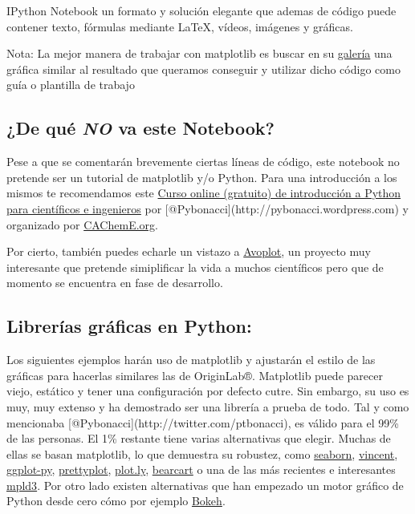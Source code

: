 \documentclass{article}
\begin{document}
IPython Notebook un formato y solución elegante que ademas de código
puede contener texto, fórmulas mediante \LaTeX, vídeos, imágenes y
gráficas.

    Nota: La mejor manera de trabajar con matplotlib es buscar en su
\href{http://matplotlib.org/gallery.html}{galería} una gráfica similar
al resultado que queramos conseguir y utilizar dicho código como guía o
plantilla de trabajo


    \subsection{¿De qué \emph{NO} va este Notebook?}


    Pese a que se comentarán brevemente ciertas líneas de código, este
notebook no pretende ser un tutorial de matplotlib y/o Python. Para una
introducción a los mismos te recomendamos este
\href{http://cacheme.org/curso-online-python-cientifico-ingenieros/}{Curso
online (gratuito) de introducción a Python para científicos e
ingenieros} por {[}@Pybonacci{]}(http://pybonacci.wordpress.com) y
organizado por \href{http://cacheme.org}{CAChemE.org}.

Por cierto, también puedes echarle un vistazo a
\href{https://www.youtube.com/watch?v=_Bm8M9IwuFk}{Avoplot}, un proyecto
muy interesante que pretende simiplificar la vida a muchos científicos
pero que de momento se encuentra en fase de desarrollo.


    \subsection{Librerías gráficas en Python:}


    Los siguientes ejemplos harán uso de matplotlib y ajustarán el estilo de
las gráficas para hacerlas similares las de OriginLab®. Matplotlib puede
parecer viejo, estático y tener una configuración por defecto cutre. Sin
embargo, su uso es muy, muy extenso y ha demostrado ser una librería a
prueba de todo. Tal y como mencionaba
{[}@Pybonacci{]}(http://twitter.com/ptbonacci), es válido para el 99\%
de las personas. El 1\% restante tiene varias alternativas que elegir.
Muchas de ellas se basan matplotlib, lo que demuestra su robustez, como
\href{http://www.stanford.edu/~mwaskom/software/seaborn/}{seaborn},
\href{http://vincent.readthedocs.org/en/latest/}{vincent},
\href{http://blog.yhathq.com/posts/ggplot-for-python.html}{ggplot-py},
\href{http://olgabot.github.io/prettyplotlib/}{prettyplot},
\href{https://plot.ly/}{plot.ly},
\href{https://github.com/wrobstory/bearcart}{bearcart} o una de las más
recientes e interesantes \href{http://mpld3.github.io/}{mpld3}. Por otro
lado existen alternativas que han empezado un motor gráfico de Python
desde cero cómo por ejemplo \href{http://bokeh.pydata.org/}{Bokeh}.
\end{document}
